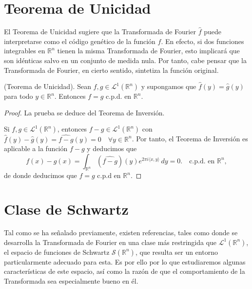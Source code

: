 \section{Teorema de Unicidad}
El Teorema de Unicidad sugiere que la Transformada de Fourier $\widehat{f}$ puede interpretarse como el código genético de la función $f$. En efecto, si dos funciones integrables en $\mathbb{R}^n$ tienen la misma Transformada de Fourier, esto implicará que son idénticas salvo en un conjunto de medida nula.
Por tanto, cabe pensar que la Transformada de Fourier, en cierto sentido, sintetiza la función original.





\begin{teorema}(Teorema de Unicidad).
Sean $f,g \in \mathscr{L}^1(\mathbb{R}^n)$ y supongamos que $\widehat{f}(y) = \widehat{g}(y)$ para todo $ y \in \mathbb{R}^n$. Entonces $f = g$ c.p.d.  en $\mathbb{R}^n$.
\end{teorema}

\begin{proof}
La prueba se deduce del Teorema de Inversión.

\noindent Si $f,g \in \mathscr{L}^1(\mathbb{R}^n)$, entonces $f-g \in \mathscr{L}^1(\mathbb{R}^n)$ con $\widehat{f}(y) - \widehat{g}(y) = \widehat{f-g}(y) = 0 \quad \forall y \in \mathbb{R}^n$.
Por tanto, el Teorema de Inversión es aplicable a la función $f-g$ y deducimos que
\begin{equation}
    f(x)-g(x) = \int_{\mathbb{R}^n}(\widehat{f-g})(y)e^{2 \pi i\langle x, y \rangle} \, dy = 0. \quad \text{c.p.d. en } \mathbb{R}^n ,
\end{equation}
de donde deducimos que $f=g$ c.p.d en $\mathbb{R}^n$.
\end{proof}

\section{Clase de Schwartz}
Tal como se ha señalado previamente, existen referencias, tales como \cite{LibroSchwartz} donde se desarrolla la Transformada de Fourier en una clase más restringida que $\mathscr{L}^1(\mathbb{R}^n)$, el espacio de funciones de Schwartz $\mathscr{S}(\mathbb{R}^n)$,
que resulta ser un entorno particularmente adecuado para esta. Es por ello por lo que estudiaremos algunas características de este espacio, así como la razón de que el comportamiento de la Transformada sea especialmente bueno en él.

